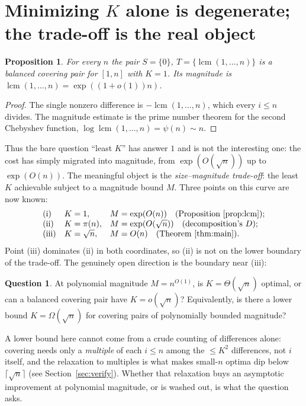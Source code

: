 \documentclass[11pt]{article}
\newtheorem{proposition}{Proposition}
\theoremstyle{definition}
\newtheorem{question}{Question}
\begin{document}
\section{Minimizing $K$ alone is degenerate; the trade-off is the real object}

\begin{proposition}\label{prop:lcm}
For every $n$ the pair $S=\{0\}$, $T=\{\operatorname{lcm}(1,\dots,n)\}$ is a balanced
covering pair for $[1,n]$ with $K=1$. Its magnitude is
$\operatorname{lcm}(1,\dots,n)=\exp((1+o(1))n)$.
\end{proposition}

\begin{proof}
The single nonzero difference is $-\operatorname{lcm}(1,\dots,n)$, which every $i\le n$
divides. The magnitude estimate is the prime number theorem for the second Chebyshev
function, $\log\operatorname{lcm}(1,\dots,n)=\psi(n)\sim n$.
\end{proof}

Thus the bare question ``least $K$'' has answer $1$ and is not the interesting one: the
cost has simply migrated into magnitude, from $\exp(O(\sqrt n))$ up to $\exp(O(n))$. The
meaningful object is the \emph{size--magnitude trade-off}: the least $K$ achievable subject
to a magnitude bound $M$. Three points on this curve are now known:
\[
  \begin{array}{lll}
    \text{(i)}   & K=1,          & M=\exp(O(n))       \quad\text{(Proposition~\ref{prop:lcm})};\\
    \text{(ii)}  & K=\pi(n),     & M=\exp(O(\sqrt n)) \quad\text{(decomposition's }D\text{)};\\
    \text{(iii)} & K=\sqrt n,    & M=O(n)             \quad\text{(Theorem~\ref{thm:main})}.
  \end{array}
\]
Point (iii) dominates (ii) in both coordinates, so (ii) is not on the lower boundary of the
trade-off. The genuinely open direction is the boundary near (iii):

\begin{question}
At polynomial magnitude $M=n^{O(1)}$, is $K=\Theta(\sqrt n)$ optimal, or can a balanced
covering pair have $K=o(\sqrt n)$? Equivalently, is there a lower bound $K=\Omega(\sqrt n)$
for covering pairs of polynomially bounded magnitude?
\end{question}

A lower bound here cannot come from a crude counting of differences alone: covering needs
only a \emph{multiple} of each $i\le n$ among the $\le K^2$ differences, not $i$ itself, and
the relaxation to multiples is what makes small-$n$ optima dip below $\lceil\sqrt n\rceil$
(see Section~\ref{sec:verify}). Whether that relaxation buys an asymptotic improvement at
polynomial magnitude, or is washed out, is what the question asks.
\end{document}
